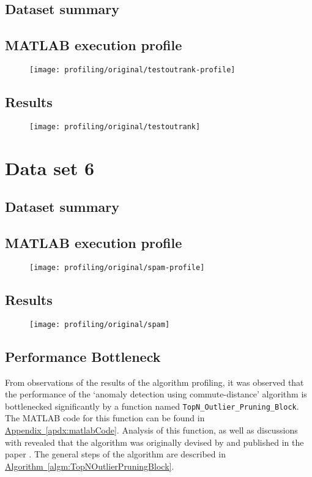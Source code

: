 \subsection{Dataset summary}

\subsection{MATLAB execution profile}
\begin{figure}[H]
	\centering
	\texttt{[image: profiling/original/testoutrank-profile]}
\end{figure}

\subsection{Results}
\begin{figure}[H]
	\centering
	\texttt{[image: profiling/original/testoutrank]}
\end{figure}


\section{Data set 6}

\subsection{Dataset summary}

\subsection{MATLAB execution profile}
\begin{figure}[H]
	\centering
	\texttt{[image: profiling/original/spam-profile]}
\end{figure}

\subsection{Results}
\begin{figure}[H]
	\centering
	\texttt{[image: profiling/original/spam]}
\end{figure}

\subsection{Performance Bottleneck}
\label{sec:algorithmPerformanceBottleneck}
From observations of the results of the algorithm profiling, it was observed 
that the performance of the `anomaly detection using commute-distance' 
algorithm is bottlenecked significantly by a function named 
\verb+TopN_Outlier_Pruning_Block+. The MATLAB code for this function can be 
found in \hyperref[apdx:matlabCode]{Appendix~\ref{apdx:matlabCode}}. Analysis of
this function, as well as discussions with \citeauthor{Khoa:2012} revealed that
the algorithm was originally devised by \citeauthor{Bay:2003} and published in
the paper . The general steps of the algorithm are described
in \hyperref[algm:TopNOutlierPruningBlock]
{Algorithm~\ref{algm:TopNOutlierPruningBlock}}.

